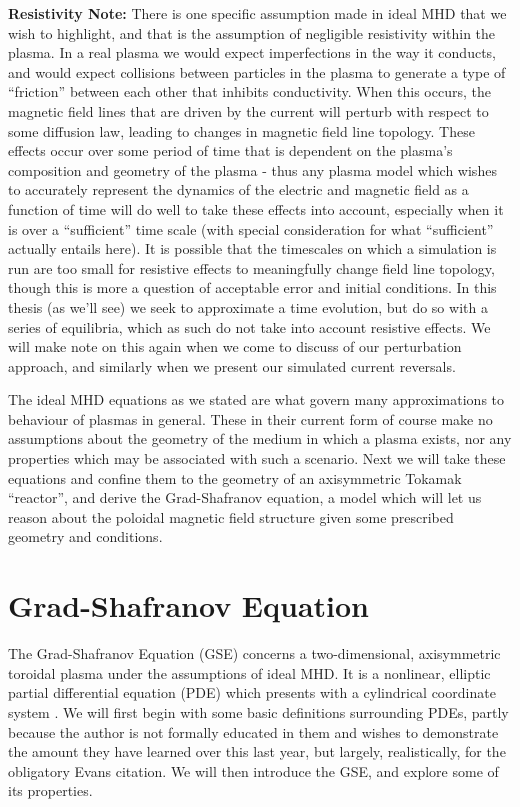 \textbf{Resistivity Note:}
There is one specific assumption made in ideal MHD that we wish to highlight, and that is the assumption of negligible 
resistivity within the plasma. In a real plasma we would expect imperfections in the way it conducts, and would expect collisions 
between particles in the plasma to generate a type of ``friction'' between each other that inhibits conductivity. 
When this occurs, the magnetic field lines that are driven by the current will perturb with respect to some diffusion law, leading to 
changes in magnetic field line topology. These effects occur over some period of time that is dependent on the plasma's 
composition and geometry of the plasma - thus any plasma model which wishes to accurately represent the dynamics of the electric 
and magnetic field as a function of time will do well to take these effects into account, especially when it is over a ``sufficient'' 
time scale (with special consideration for what ``sufficient'' actually entails here). It is possible that the timescales on which 
a simulation is run are too small for resistive effects to meaningfully change field line topology, though this is more a question of 
acceptable error and initial conditions. In this thesis (as we'll see) we seek to approximate a time evolution, but do so with 
a series of equilibria, which as such do not take into account resistive effects. We will make note on this again when we come to 
discuss of our perturbation approach, and similarly when we present our simulated current reversals.

The ideal MHD equations as we stated are what govern many approximations to behaviour of plasmas in general. These in their current 
form of course make no assumptions about the geometry of the medium in which a plasma exists, nor any properties which 
may be associated with such a scenario. Next we will take these equations and confine them to the geometry of an axisymmetric Tokamak 
``reactor'', and derive the Grad-Shafranov equation, a model which will let us reason about the poloidal magnetic field structure given 
some prescribed geometry and conditions.

\section{Grad-Shafranov Equation}

The Grad-Shafranov Equation (GSE) concerns a two-dimensional, axisymmetric toroidal plasma under the 
assumptions of ideal MHD. It is a nonlinear, elliptic partial differential equation (PDE) which presents 
with a cylindrical coordinate system \cite{shafranov-paper}. We will first begin with some basic definitions surrounding PDEs, partly 
because the author is not formally educated in them and wishes to demonstrate the 
amount they have learned over this last year, but largely, realistically, for the obligatory Evans citation. We 
will then introduce the GSE, and explore some of its properties.

